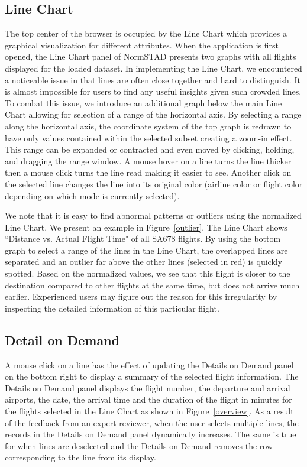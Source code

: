 \documentclass{sig-alternate}
\begin{document}
\subsection{Line Chart}
\label{subsec-linechart}
The top center of the browser is occupied by the Line Chart which provides a graphical
visualization for different attributes. When the application is first opened,
the Line Chart panel of NormSTAD presents two graphs with all flights displayed for the loaded
dataset. In implementing the Line Chart, we encountered a noticeable issue in that lines are often
close together and hard to distinguish. It is almost impossible for users to find any useful insights
given such crowded lines. To combat this issue, we introduce an additional graph below the main
Line Chart allowing for selection of a range of the horizontal axis. By selecting a range along 
the horizontal axis, the coordinate system of the top graph is redrawn to have only values contained within
the selected subset creating a zoom-in effect. This range can be expanded or contracted and even moved
by clicking, holding, and dragging the range window. A mouse hover on a line turns the line thicker
then a mouse click turns the line read making it easier to see. Another click on the selected 
line changes the line into its original color (airline color or flight color depending on 
which mode is currently selected). 

We note that it is easy to find abnormal patterns or outliers using the normalized Line Chart. We 
present an example in Figure~\ref{outlier}. The Line Chart shows ``Distance vs. Actual
Flight Time" of all SA678 flights. By using the bottom graph to select a range of the lines 
in the Line Chart, the overlapped lines are separated and an outlier far above the other
lines (selected in red) is quickly spotted. Based on the normalized values, we see that this 
flight is closer to the destination compared to other flights at the same time, but does 
not arrive much earlier. Experienced users may figure out the reason for this irregularity
by inspecting the detailed information of this particular flight. 

\subsection{Detail on Demand}
\label{subsec-details}
A mouse click on a line has the effect of updating the Details on Demand panel
on the bottom right to display a summary of the selected flight information.
The Details on Demand panel displays the flight number, the departure and arrival
airports, the date, the arrival time and the duration of the flight in minutes for the flights 
selected in the Line Chart as shown in Figure~\ref{overview}.
 As a result of the feedback from an expert reviewer, when
the user selects multiple lines, the records in the Details on Demand panel 
dynamically increases. The same is true for when lines are deselected and the 
Details on Demand removes the row corresponding to the line from its display.  
\end{document}
